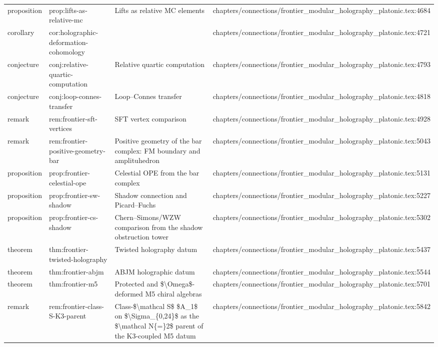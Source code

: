 \documentclass[11pt]{article}
\begin{document}
\begin{longtable}{L{0.10\textwidth}L{0.26\textwidth}L{0.42\textwidth}L{0.22\textwidth}}
proposition & prop:lifts-as-relative-mc & Lifts as relative MC elements & chapters/connections/frontier\_modular\_holography\_platonic.tex:4684\\
corollary & cor:holographic-deformation-cohomology &  & chapters/connections/frontier\_modular\_holography\_platonic.tex:4721\\
conjecture & conj:relative-quartic-computation & Relative quartic computation & chapters/connections/frontier\_modular\_holography\_platonic.tex:4793\\
conjecture & conj:loop-connes-transfer & Loop--Connes transfer & chapters/connections/frontier\_modular\_holography\_platonic.tex:4818\\
remark & rem:frontier-sft-vertices & SFT vertex comparison & chapters/connections/frontier\_modular\_holography\_platonic.tex:4928\\
remark & rem:frontier-positive-geometry-bar & Positive geometry of the bar complex: FM boundary and amplituhedron & chapters/connections/frontier\_modular\_holography\_platonic.tex:5043\\
proposition & prop:frontier-celestial-ope & Celestial OPE from the bar complex & chapters/connections/frontier\_modular\_holography\_platonic.tex:5131\\
proposition & prop:frontier-sw-shadow & Shadow connection and Picard--Fuchs & chapters/connections/frontier\_modular\_holography\_platonic.tex:5227\\
proposition & prop:frontier-cs-shadow & Chern--Simons/WZW comparison from the shadow obstruction tower & chapters/connections/frontier\_modular\_holography\_platonic.tex:5302\\
theorem & thm:frontier-twisted-holography & Twisted holography datum & chapters/connections/frontier\_modular\_holography\_platonic.tex:5437\\
theorem & thm:frontier-abjm & ABJM holographic datum & chapters/connections/frontier\_modular\_holography\_platonic.tex:5544\\
theorem & thm:frontier-m5 & Protected and \$\textbackslash{}Omega\$-deformed M5 chiral algebras & chapters/connections/frontier\_modular\_holography\_platonic.tex:5701\\
remark & rem:frontier-class-S-K3-parent & Class-\$\textbackslash{}mathcal S\$ \$A\_1\$ on \$\textbackslash{}Sigma\_\{0,24\}\$ as the \$\textbackslash{}mathcal N\{=\}2\$ parent of the K3-coupled M5 datum & chapters/connections/frontier\_modular\_holography\_platonic.tex:5842\\

\end{longtable}
\end{document}
